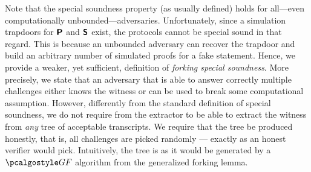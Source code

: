 Note that the special soundness property (as usually defined) holds for
all---even computationally unbounded---adversaries. Unfortunately, since a
simulation trapdoors for $\bm{\mathsf{P}}$ and $\bm{\mathsf{S}}$ exist, the protocols
cannot be special sound in that regard. This is because an unbounded adversary
can recover the trapdoor and build an arbitrary number of simulated proofs for a fake
statement. Hence, we provide a weaker, yet sufficient, definition of
\emph{forking special soundness}. More precisely, we state that an
adversary that is able to answer correctly multiple challenges either knows the
witness or can be used to break some computational assumption.
However, differently from the standard definition of special soundness, we do
not require from the extractor to be able to extract the witness from \emph{any}
tree of acceptable transcripts. We require that the tree be produced honestly,
that is, all challenges are picked randomly --- exactly as an honest verifier would pick.
Intuitively, the tree is as it would be generated by a $\genforking$
algorithm from the generalized forking lemma.


